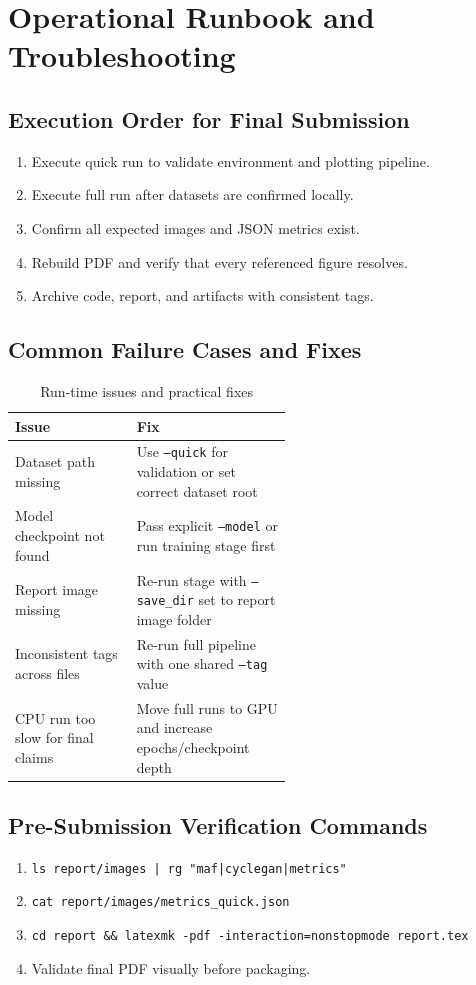 \documentclass[conference]{IEEEtran}
\begin{document}
\section{Operational Runbook and Troubleshooting}
\subsection{Execution Order for Final Submission}
\begin{enumerate}
\item Execute quick run to validate environment and plotting pipeline.
\item Execute full run after datasets are confirmed locally.
\item Confirm all expected images and JSON metrics exist.
\item Rebuild PDF and verify that every referenced figure resolves.
\item Archive code, report, and artifacts with consistent tags.
\end{enumerate}

\subsection{Common Failure Cases and Fixes}
\begin{table}[!t]
\centering
\caption{Run-time issues and practical fixes}
\begin{tabular}{|p{0.30\linewidth}|p{0.25\linewidth}|}
\hline
\textbf{Issue} & \textbf{Fix} \\
\hline
Dataset path missing & Use \texttt{--quick} for validation or set correct dataset root \\
\hline
Model checkpoint not found & Pass explicit \texttt{--model} or run training stage first \\
\hline
Report image missing & Re-run stage with \texttt{--save\_dir} set to report image folder \\
\hline
Inconsistent tags across files & Re-run full pipeline with one shared \texttt{--tag} value \\
\hline
CPU run too slow for final claims & Move full runs to GPU and increase epochs/checkpoint depth \\
\hline
\end{tabular}
\end{table}

\subsection{Pre-Submission Verification Commands}
\begin{enumerate}
\item \texttt{ls report/images | rg "maf|cyclegan|metrics"}
\item \texttt{cat report/images/metrics\_quick.json}
\item \texttt{cd report \&\& latexmk -pdf -interaction=nonstopmode report.tex}
\item Validate final PDF visually before packaging.
\end{enumerate}
\end{document}
